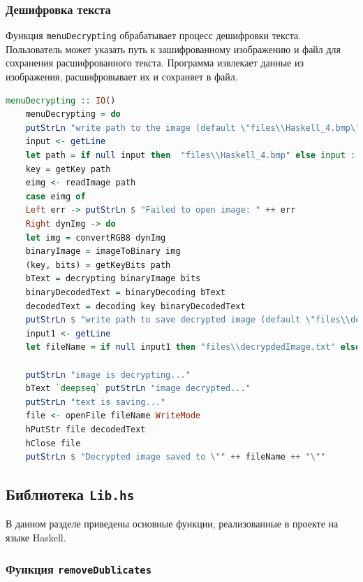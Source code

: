 \documentclass[10pt,a4paper,final]{article} %
\begin{document}
\subsubsection{Дешифровка текста}

Функция \texttt{menuDecrypting} обрабатывает процесс дешифровки текста. Пользователь может указать путь к зашифрованному изображению и файл для сохранения расшифрованного текста. Программа извлекает данные из изображения, расшифровывает их и сохраняет в файл.

\begin{lstlisting}[language=Haskell, caption=Дешифровка текста]
	menuDecrypting :: IO()
	menuDecrypting = do
	putStrLn "write path to the image (default \"files\\Haskell_4.bmp\")"
	input <- getLine
	let path = if null input then  "files\\Haskell_4.bmp" else input :: String
	key = getKey path
	eimg <- readImage path
	case eimg of
	Left err -> putStrLn $ "Failed to open image: " ++ err
	Right dynImg -> do 
	let img = convertRGB8 dynImg   
	binaryImage = imageToBinary img
	(key, bits) = getKeyBits path
	bText = decrypting binaryImage bits
	binaryDecodedText = binaryDecoding bText
	decodedText = decoding key binaryDecodedText
	putStrLn $ "write path to save decrypted image (default \"files\\decrypdedImage.txt\")"
	input1 <- getLine
	let fileName = if null input1 then "files\\decrypdedImage.txt" else input1 :: String
	
	putStrLn "image is decrypting..."
	bText `deepseq` putStrLn "image decrypted..."
	putStrLn "text is saving..."
	file <- openFile fileName WriteMode
	hPutStr file decodedText
	hClose file
	putStrLn $ "Decrypted image saved to \"" ++ fileName ++ "\""
\end{lstlisting}







\subsection{Библиотека \texttt{Lib.hs}}

В данном разделе приведены основные функции, реализованные в проекте на языке Haskell.

\subsubsection{Функция \texttt{removeDublicates}}
\end{document}

